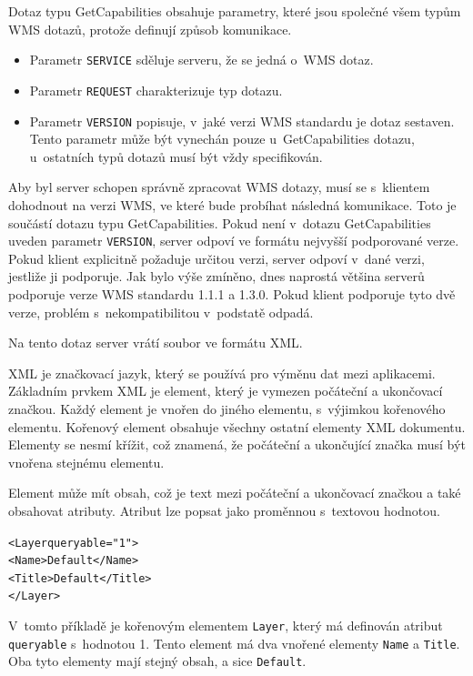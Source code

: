 \documentclass[a4paper,12pt]{article}
\begin{document}
 Dotaz typu GetCapabilities obsahuje parametry, které jsou společné
 všem typům WMS dotazů, protože definují způsob komunikace.
\begin{itemize}
  \item Parametr {\tt SERVICE} sděluje serveru, že se jedná o~WMS dotaz. 
  \item Parametr {\tt REQUEST} charakterizuje typ dotazu. 
  \item Parametr {\tt VERSION} popisuje, v~jaké verzi WMS standardu je dotaz sestaven.
        Tento parametr může být vynechán pouze u~GetCapabilities dotazu, 
        u~ostatních typů dotazů musí být vždy specifikován.
\end{itemize}

Aby byl server schopen správně zpracovat WMS dotazy, musí se
s~klientem dohodnout na verzi WMS, ve které bude probíhat následná
komunikace.  Toto je součástí dotazu typu GetCapabilities. Pokud není
v~dotazu GetCapabilities uveden parametr {\tt VERSION}, server odpoví ve
formátu nejvyšší podporované verze.  Pokud klient explicitně požaduje
určitou verzi, server odpoví v~dané verzi, jestliže ji podporuje. Jak
bylo výše zmíněno, dnes naprostá většina serverů podporuje verze WMS
standardu 1.1.1 a 1.3.0. Pokud klient podporuje tyto dvě verze,
problém s~nekompatibilitou v~podstatě odpadá.

Na tento dotaz server vrátí soubor ve formátu XML. 

XML je značkovací jazyk, který se používá pro výměnu dat mezi aplikacemi.
Základním prvkem XML je element, který je vymezen počáteční a ukončovací 
značkou. Každý element je vnořen do jiného elementu, s~výjimkou
kořenového elementu.
Kořenový element obsahuje všechny ostatní elementy XML dokumentu. 
Elementy se nesmí
křížit, což znamená, že počáteční a ukončující značka musí být vnořena
stejnému elementu. 

Element může mít obsah, což je text mezi počáteční a ukončovací značkou a 
také obsahovat atributy. Atribut lze popsat jako proměnnou s~textovou hodnotou.

\begin{alltt}\footnotesize
 <Layer queryable="1">
        <Name>Default</Name>
        <Title>Default</Title>
</Layer>
\end{alltt}

V~tomto příkladě je kořenovým elementem {\tt Layer}, který má definován atribut 
{\tt queryable} s~hodnotou 1. Tento element má dva vnořené elementy {\tt Name} a {\tt Title}. 
Oba tyto elementy mají stejný obsah, a sice {\tt Default}. 
\end{document}
